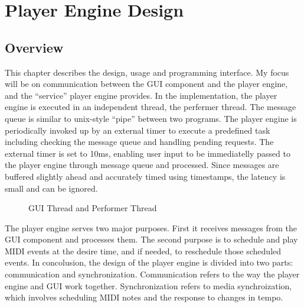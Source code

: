 
\chapter{Player Engine Design} %



\ifpdf
    \graphicspath{{X/figures/PNG/}{X/figures/PDF/}{X/figures/}}
\else
    \graphicspath{{X/figures/EPS/}{X/figures/}}
\fi

\section{Overview}
This chapter describes the design, usage and programming interface. My focus 
will be on communication between the GUI component and the player engine, and 
the ``service'' player engine provides. In the implementation, the player 
engine is executed in an independent thread, the perfermer thread. The 
message queue is similar to unix-style ``pipe'' between two programs. The 
player engine is periodically invoked up by an external timer to 
execute a predefined task including checking the message queue and handling 
pending requests. The external timer is set to 10ms, enabling user 
input to be immediatelly passed to the player engine through message queue and 
processed. Since messages are buffered slightly ahead and accurately timed 
using timestamps, the latency is small and can be ignored.

\begin{figure}[H]
\caption{GUI Thread and Performer Thread}
\label{fig:speciation}
\end{figure}

The player engine serves two major purposes. First it receives
messages from the GUI component and processes them. The second purpose is to 
schedule and play MIDI events at the desire time, and if needed, to
reschedule those scheduled events. In concolusion, the design of the player 
engine is divided into two parts: communication and synchronization. 
Communication refers to the way the player engine and GUI work together. 
Synchronization refers to media synchroization, which involves scheduling 
MIDI notes and the response to changes in tempo. 

